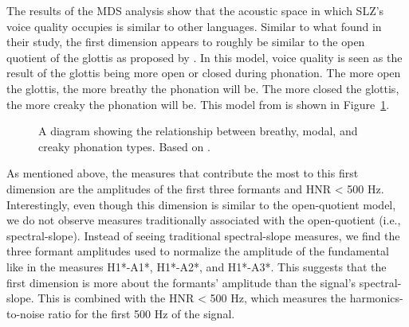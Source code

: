 The results of the MDS analysis show that the acoustic space in which SLZ's voice quality occupies is similar to other languages. Similar to what \citet{keatingCrosslanguageAcousticSpace2023} found in their study, the first dimension appears to roughly be similar to the open quotient of the glottis as proposed by \citet{gordonPhonationTypesCrosslinguistic2001}. In this model, voice quality is seen as the result of the glottis being more open or closed during phonation. The more open the glottis, the more breathy the phonation will be. The more closed the glottis, the more creaky the phonation will be. This model from \citet{gordonPhonationTypesCrosslinguistic2001} is shown in Figure~\ref{fig:phonation_types}.

\begin{figure}[h!]
    \centering
    \caption{A diagram showing the relationship between breathy, modal, and creaky phonation types. Based on \citet{gordonPhonationTypesCrosslinguistic2001}.}
    \label{fig:phonation_types}
\end{figure}

As mentioned above, the measures that contribute the most to this first dimension are the amplitudes of the first three formants and HNR < 500 Hz. Interestingly, even though this dimension is similar to the open-quotient model, we do not observe measures traditionally associated with the open-quotient (i.e., spectral-slope). Instead of seeing traditional spectral-slope measures, we find the three formant amplitudes used to normalize the amplitude of the fundamental like in the measures H1*-A1*, H1*-A2*, and H1*-A3*. This suggests that the first dimension is more about the formants' amplitude than the signal's spectral-slope. This is combined with the HNR < 500 Hz, which measures the harmonics-to-noise ratio for the first 500 Hz of the signal. 

